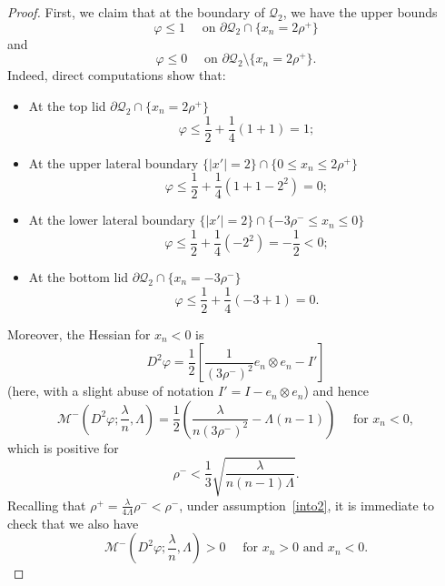 \documentclass[letter,11pt]{amsart}
\newcommand{\id}{I}
\newcommand{\gcal}{\mathcal{Q}}
\newcommand{\mcal}{\mathcal{M}}
\theoremstyle{definition}
\numberwithin{equation}{section}
\begin{document}
\begin{proof}
First, we claim that at the boundary of $\gcal_2$, we have the upper bounds
\begin{equation}
\label{bedo1}
\varphi \leq 1 \quad \text{ on } \partial \gcal_2 \cap \{x_n = 2\rho^{+}\}
\end{equation}
and
\begin{equation}
\label{bedo2}
\varphi \leq 0 \quad \text{ on } \partial \gcal_2 \setminus \{x_n = 2\rho^{+}\}.
\end{equation}
Indeed, direct computations show that:
\begin{itemize}
\item At the top lid $\partial \gcal_2 \cap \{x_n = 2\rho^{+}\}$
\[
\varphi \leq \frac{1}{2} + \frac{1}{4} (1 + 1) = 1;
\]
\item At the upper lateral boundary 
$\{|x'| = 2\} \cap \{0 \leq x_n \leq 2 \rho^{+}\}$
\[
\varphi \leq \frac{1}{2} + \frac{1}{4}(1 + 1- 2^2) = 0;
\]
\item At the lower lateral boundary 
$\{|x'| = 2\} \cap \{-3\rho^{-} \leq x_n \leq 0 \}$
\[
\varphi \leq \frac{1}{2} + \frac{1}{4}(-2^2) = - \frac{1}{2} <0;
\]
\item At the bottom lid $\partial \gcal_2 \cap \{x_n = - 3\rho^{-}\}$ 
\[
\varphi \leq \frac{1}{2} + \frac{1}{4} (-3+1) = 0.
\]
\end{itemize}
Moreover, 
the Hessian for $x_n < 0$ is
\[
D^2 \varphi = 
\frac{1}{2}
\left[
\frac{1}{( 3\rho^{-})^2} e_n \otimes e_n - \id'
\right]
\]
(here, with a slight abuse of notation $I' = \id - e_n \otimes e_n$)
and hence
\[
\textstyle
\mcal^{-}(D^2 \varphi; \frac{\lambda}{n}, \Lambda) = 
\displaystyle
\frac{1}{2} \left(\frac{\lambda}{n(3 \rho^{-})^2} - \Lambda(n-1) \right) 
\quad \text{ for } x_n < 0,
\]
which is positive for
\begin{equation}
\label{into2}
\rho^{-} < \frac{1}{3} \sqrt{\frac{\lambda}{n(n-1)\Lambda}}.
\end{equation}
Recalling that $\rho^{+} = \frac{\lambda}{4 \Lambda} \rho^{-} < \rho^{-}$, 
under assumption~\eqref{into2},
it is immediate to check that we also have
\begin{equation}
\label{bedo3}
\textstyle
\mcal^{-}(D^2 \varphi; \frac{\lambda}{n}, \Lambda) > 0 \quad \text{ for } x_n > 0 \text{ and } x_n < 0.
\end{equation}

\medskip


\end{proof}
\end{document}
